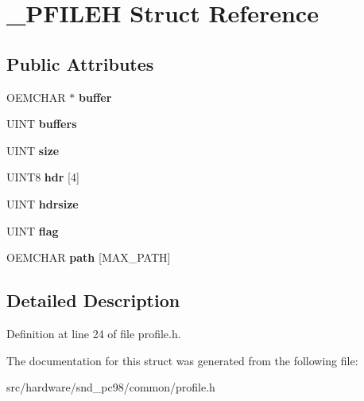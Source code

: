 \hypertarget{struct__PFILEH}{\section{\-\_\-\-P\-F\-I\-L\-E\-H Struct Reference}
\label{struct__PFILEH}
}
\subsection*{Public Attributes}
\begin{DoxyCompactItemize}
\item 
\hypertarget{struct__PFILEH_ada5746ec01406a5fc0911c681761ad34}{O\-E\-M\-C\-H\-A\-R $\ast$ {\bfseries buffer}}\label{struct__PFILEH_ada5746ec01406a5fc0911c681761ad34}

\item 
\hypertarget{struct__PFILEH_ad4270e654472f9f3ad6fc2aa75f3b551}{U\-I\-N\-T {\bfseries buffers}}\label{struct__PFILEH_ad4270e654472f9f3ad6fc2aa75f3b551}

\item 
\hypertarget{struct__PFILEH_ab8b3fcc19ae48939210743e92275c73e}{U\-I\-N\-T {\bfseries size}}\label{struct__PFILEH_ab8b3fcc19ae48939210743e92275c73e}

\item 
\hypertarget{struct__PFILEH_a08cd29edcecb0a516033a7520907f51e}{U\-I\-N\-T8 {\bfseries hdr} \mbox{[}4\mbox{]}}\label{struct__PFILEH_a08cd29edcecb0a516033a7520907f51e}

\item 
\hypertarget{struct__PFILEH_a7c774742dbc57f905745cfdd154285c1}{U\-I\-N\-T {\bfseries hdrsize}}\label{struct__PFILEH_a7c774742dbc57f905745cfdd154285c1}

\item 
\hypertarget{struct__PFILEH_a52c69a90e0b580b506defa1a49c16bbb}{U\-I\-N\-T {\bfseries flag}}\label{struct__PFILEH_a52c69a90e0b580b506defa1a49c16bbb}

\item 
\hypertarget{struct__PFILEH_adce6da4b3d5252ff4f45f549ff0b149c}{O\-E\-M\-C\-H\-A\-R {\bfseries path} \mbox{[}M\-A\-X\-\_\-\-P\-A\-T\-H\mbox{]}}\label{struct__PFILEH_adce6da4b3d5252ff4f45f549ff0b149c}

\end{DoxyCompactItemize}


\subsection{Detailed Description}


Definition at line 24 of file profile.\-h.



The documentation for this struct was generated from the following file\-:\begin{DoxyCompactItemize}
\item 
src/hardware/snd\-\_\-pc98/common/profile.\-h\end{DoxyCompactItemize}
